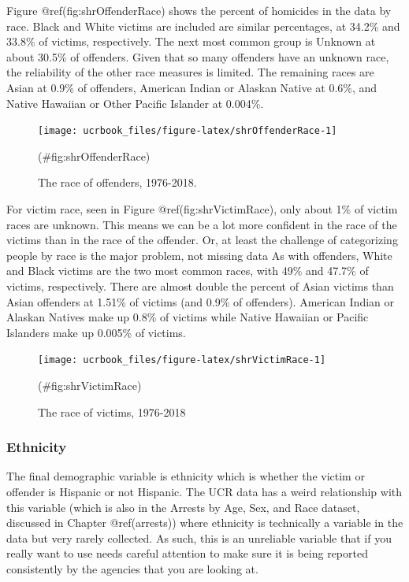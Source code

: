 \documentclass[
  12pt,
  openany]{book}
\begin{document}
Figure @ref(fig:shrOffenderRace) shows the percent of homicides in the data by race. Black and White victims are included are similar percentages, at 34.2\% and 33.8\% of victims, respectively. The next most common group is Unknown at about 30.5\% of offenders. Given that so many offenders have an unknown race, the reliability of the other race measures is limited. The remaining races are Asian at 0.9\% of offenders, American Indian or Alaskan Native at 0.6\%, and Native Hawaiian or Other Pacific Islander at 0.004\%.

\begin{figure}

{\centering \texttt{[image: ucrbook\_files/figure-latex/shrOffenderRace-1]} 

}

\caption{The race of offenders, 1976-2018.}(\#fig:shrOffenderRace)
\end{figure}

For victim race, seen in Figure @ref(fig:shrVictimRace), only about 1\% of victim races are unknown. This means we can be a lot more confident in the race of the victims than in the race of the offender. Or, at least the challenge of categorizing people by race is the major problem, not missing data As with offenders, White and Black victims are the two most common races, with 49\% and 47.7\% of victims, respectively. There are almost double the percent of Asian victims than Asian offenders at 1.51\% of victims (and 0.9\% of offenders). American Indian or Alaskan Natives make up 0.8\% of victims while Native Hawaiian or Pacific Islanders make up 0.005\% of victims.

\begin{figure}

{\centering \texttt{[image: ucrbook\_files/figure-latex/shrVictimRace-1]} 

}

\caption{The race of victims, 1976-2018}(\#fig:shrVictimRace)
\end{figure}

\hypertarget{ethnicity-1}{%
\subsubsection{Ethnicity}\label{ethnicity-1}}

The final demographic variable is ethnicity which is whether the victim or offender is Hispanic or not Hispanic. The UCR data has a weird relationship with this variable (which is also in the Arrests by Age, Sex, and Race dataset, discussed in Chapter @ref(arrests)) where ethnicity is technically a variable in the data but very rarely collected. As such, this is an unreliable variable that if you really want to use needs careful attention to make sure it is being reported consistently by the agencies that you are looking at.
\end{document}
